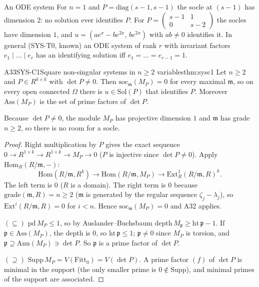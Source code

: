 \begin{example}{An ODE system}
For $n=1$ and $P=\mathrm{diag}(s-1,s-1)$ the socle at $(s-1)$ has dimension $2$: no solution ever identifies $P$. For $P=\begin{pmatrix}s-1&1\\0&s-2\end{pmatrix}$ the socles have dimension $1$, and $u=(ae^x-be^{2x},\,be^{2x})$ with $ab\ne0$ identifies it. In general (SYS-T0, known) an ODE system of rank $r$ with invariant factors $e_1\mid\dots\mid e_r$ has an identifying solution iff $e_1=\dots=e_{r-1}=1$.
\end{example}

\begin{dimcard}{A33}{SYS-C1}{Square non-singular systems in $n\ge2$ variables}{\proved}{thm:sysc1}
Let $n\ge2$ and $P\in R^{k\times k}$ with $\det P\ne0$. Then $\mathrm{soc}_{\mathfrak m}(M_P)=0$ for every maximal $\mathfrak m$, so on every open connected $\Omega$ there is $u\in\mathrm{Sol}(P)$ that identifies $P$. Moreover $\mathrm{Ass}(M_P)$ is the set of prime factors of $\det P$.
\end{dimcard}

\begin{proofidea}
Because $\det P\ne0$, the module $M_P$ has projective dimension $1$ and $\mathfrak m$ has grade $n\ge2$, so there is no room for a socle.
\end{proofidea}

\begin{proof}
Right multiplication by $P$ gives the exact sequence $0\to R^{1\times k}\to R^{1\times k}\to M_P\to0$ ($P$ is injective since $\det P\ne0$). Apply $\mathrm{Hom}_R(R/\mathfrak m,-)$:
\[
\mathrm{Hom}(R/\mathfrak m,R^k)\to\mathrm{Hom}(R/\mathfrak m,M_P)\to\mathrm{Ext}^1_R(R/\mathfrak m,R)^k .
\]
The left term is $0$ ($R$ is a domain). The right term is $0$ because $\mathrm{grade}(\mathfrak m,R)=n\ge2$ ($\mathfrak m$ is generated by the regular sequence $\zeta_j-\lambda_j$), so $\mathrm{Ext}^i(R/\mathfrak m,R)=0$ for $i<n$. Hence $\mathrm{soc}_{\mathfrak m}(M_P)=0$ and A32 applies.

$(\subseteq)$ $\mathrm{pd}\,M_P\le1$, so by Auslander--Buchsbaum $\mathrm{depth}\,M_{\mathfrak p}\ge\mathrm{ht}\,\mathfrak p-1$. If $\mathfrak p\in\mathrm{Ass}(M_P)$, the depth is $0$, so $\mathrm{ht}\,\mathfrak p\le1$; $\mathfrak p\ne0$ since $M_P$ is torsion, and $\mathfrak p\supseteq\mathrm{Ann}(M_P)\ni\det P$. So $\mathfrak p$ is a prime factor of $\det P$.

$(\supseteq)$ $\mathrm{Supp}\,M_P=V(\mathrm{Fitt}_0)=V(\det P)$. A prime factor $(f)$ of $\det P$ is minimal in the support (the only smaller prime is $0\notin\mathrm{Supp}$), and minimal primes of the support are associated.

\end{proof}


